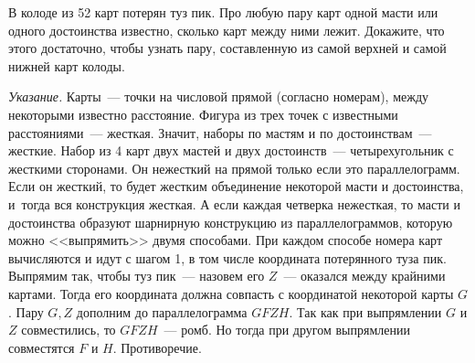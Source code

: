 \problem
В колоде из 52 карт потерян туз пик.
Про любую пару карт одной масти или одного достоинства известно, сколько карт
между ними лежит.
Докажите, что этого достаточно, чтобы узнать пару, составленную из самой
верхней и самой нижней карт колоды.

\solution
\emph{Указание.}
Карты~--- точки на числовой прямой (согласно номерам), между некоторыми
известно расстояние.
Фигура из трех точек с известными расстояниями~--- жесткая.
Значит, наборы по мастям и по достоинствам~--- жесткие.
Набор из 4 карт двух мастей и двух достоинств~--- четырехугольник с жесткими
сторонами.
Он нежесткий на прямой только если это параллелограмм.
Если он жесткий, то будет жестким объединение некоторой масти и достоинства,
и~тогда вся конструкция жесткая.
А если каждая четверка нежесткая, то масти и достоинства образуют шарнирную
конструкцию из параллелограммов, которую можно <<выпрямить>> двумя способами.
При каждом способе номера карт вычисляются и идут с шагом 1, в том числе
координата потерянного туза пик.
Выпрямим так, чтобы туз пик~--- назовем его $Z$~--- оказался между крайними
картами.
Тогда его координата должна совпасть с координатой некоторой карты $G$.
Пару $G,Z$ дополним до параллелограмма $GFZH$.
Так как при выпрямлении $G$ и $Z$ совместились, то $GFZH$~--- ромб.
Но тогда при другом выпрямлении совместятся $F$ и $H$.
Противоречие.
\endproblem
